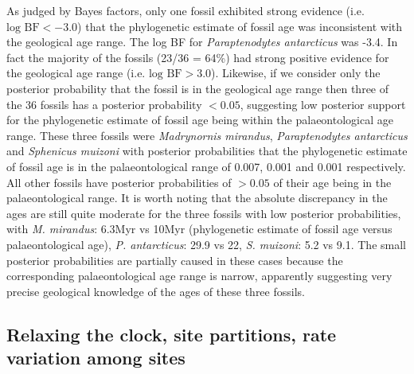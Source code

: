 \documentclass[11pt]{article}
\begin{document}
As judged by Bayes factors, only one fossil exhibited strong evidence (i.e. $\text{log BF} < -3.0$) that the phylogenetic estimate of fossil age was inconsistent with the geological age range. The log BF for {\em Paraptenodytes antarcticus} was -3.4. In fact the majority of the fossils (23/36 = 64\%) had strong positive evidence for the geological age range (i.e. $\text{log BF} > 3.0$).
Likewise, if we consider only the posterior probability that the fossil is in the geological age range then three of the 36 fossils has a posterior probability $< 0.05$, suggesting low posterior support for the phylogenetic estimate of fossil age being within the palaeontological age range.
These three fossils were {\em Madrynornis mirandus}, {\em Paraptenodytes antarcticus} and {\em Sphenicus muizoni} with posterior probabilities that the phylogenetic estimate of fossil age is in the palaeontological range of 0.007, 0.001 and 0.001 respectively. 
All other fossils have posterior probabilities of $> 0.05$ of their age being in the palaeontological range. 
It is worth noting that the absolute discrepancy in the ages are still quite moderate for the three fossils with low posterior probabilities, with {\em M. mirandus}: 6.3Myr vs 10Myr (phylogenetic estimate of fossil age versus palaeontological age), {\em P. antarcticus}: 29.9 vs 22, {\em S. muizoni}: 5.2 vs 9.1. 
The small posterior probabilities are partially caused in these cases because the corresponding palaeontological age range is narrow, apparently suggesting very precise geological knowledge of the ages of these three fossils.

\subsection*{Relaxing the clock, site partitions, rate variation among sites}
\end{document}
